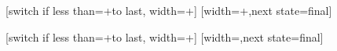 %

{
  [switch if less than=+\pgfdecorationsegmentlength to last,
               width=+\pgfdecorationsegmentlength]
  {
    \pgfpathmoveto{\pgfpointorigin}
    \pgfpathlineto{\pgfpointpolar{\pgfdecorationsegmentangle}{+\pgfdecorationsegmentamplitude}}
  }
  [width=+\pgfdecorationsegmentamplitude,next state=final]
  {
    \pgfpathmoveto{\pgfpointorigin}
    \pgfpathlineto{\pgfpointpolar{\pgfdecorationsegmentangle}{+\pgfdecorationsegmentamplitude}}
  }  
  {
    \pgfpathmoveto{\pgfpointdecoratedpathlast}
  }
}




%

{
  [switch if less than=+\pgfdecorationsegmentlength to last,
                   width=+\pgfdecorationsegmentlength]
  {
    \pgfpathmoveto{\pgfqpoint{0pt}{\pgfdecorationsegmentamplitude}}
    \pgfpathlineto{\pgfqpoint{\pgfdecorationsegmentobjectlength}{-\pgfdecorationsegmentamplitude}}
    \pgfpathmoveto{\pgfqpoint{0pt}{-\pgfdecorationsegmentamplitude}}
    \pgfpathlineto{\pgfqpoint{\pgfdecorationsegmentobjectlength}{\pgfdecorationsegmentamplitude}}
  }
  [width=\pgfdecorationsegmentobjectlength,next state=final]
  {
    \pgfpathmoveto{\pgfqpoint{0pt}{\pgfdecorationsegmentamplitude}}
    \pgfpathlineto{\pgfqpoint{\pgfdecorationsegmentobjectlength}{-1\pgfdecorationsegmentamplitude}}
    \pgfpathmoveto{\pgfqpoint{0pt}{-\pgfdecorationsegmentamplitude}}
    \pgfpathlineto{\pgfqpoint{\pgfdecorationsegmentobjectlength}{\pgfdecorationsegmentamplitude}}
  }
  {
    \pgfpathmoveto{\pgfpointdecoratedpathlast}
  }
}






%

